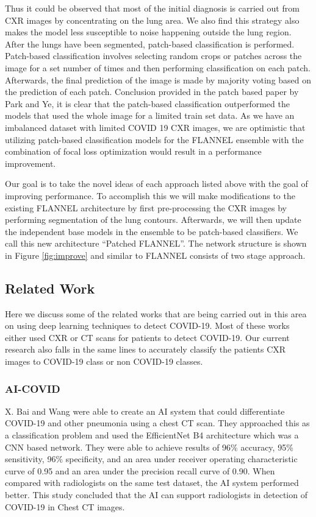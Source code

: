\documentclass{sigkddExp}
\begin{document}
Thus it could be observed that most of the initial diagnosis is carried out from
CXR images by concentrating on the lung area. We also find this strategy also
makes the model less susceptible to noise happening outside the lung region.
After the lungs have been segmented, patch-based classification is performed.
Patch-based classification involves selecting random crops or patches across the
image for a set number of times and then performing classification on each
patch. Afterwards, the final prediction of the image is made by majority voting
based on the prediction of each patch. Conclusion provided in the patch based
paper \cite{pmid32396075} by Park and Ye, it is clear that the patch-based
classification outperformed the models that used the whole image for a limited
train set data. As we have an imbalanced dataset with limited COVID 19 CXR
images, we are optimistic that utilizing patch-based classification models for
the FLANNEL ensemble with the combination of focal loss optimization would
result in a performance improvement.

Our goal is to take the novel ideas of each approach listed above with the goal
of improving performance. To accomplish this we will make modifications to the
existing FLANNEL architecture by first pre-processing the CXR images by
performing segmentation of the lung contours. Afterwards, we will then update
the independent base models in the ensemble to be patch-based classifiers. We
call this new architecture “Patched FLANNEL”. The network structure is shown in
Figure \ref{fig:improve} and similar to FLANNEL consists of two stage approach.

\subsection{Related Work}

Here we discuss some of the related works that are being carried out in this
area on using deep learning techniques to detect COVID-19. Most of these works
either used CXR or CT scans for patients to detect COVID-19. Our current
research also falls in the same lines to accurately classify the patients CXR
images to COVID-19 class or non COVID-19 classes.

\subsubsection{AI-COVID}

X. Bai and Wang \cite{pmid32339081} were able to create an AI system that could
differentiate COVID-19 and other pneumonia using a chest CT scan. They
approached this as a classification problem and used the EfficientNet B4
architecture which was a CNN based network. They were able to achieve results of
96\% accuracy, 95\% sensitivity, 96\% specificity, and an area under receiver
operating characteristic curve of 0.95 and an area under the precision recall
curve of 0.90. When compared with radiologists on the same test dataset, the AI
system performed better. This study concluded that the AI can support
radiologists in detection of COVID-19 in Chest CT images.
\end{document}
